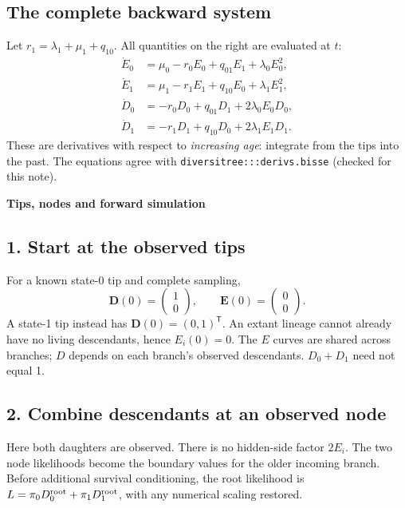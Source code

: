 \documentclass[11pt,a4paper]{article}
\newcommand{\head}[2]{\noindent{\small\sffamily\color{muted}BISSE / #1}\par
 {\LARGE\sffamily\bfseries #2}\par\vspace{3mm}}
\begin{document}
\subsection*{The complete backward system}
Let \(r_1=\lambda_1+\mu_1+q_{10}\). All quantities on the right are evaluated at \(t\):
\[
\begin{aligned}
\dot E_0&=\mu_0-r_0E_0+q_{01}E_1+\lambda_0E_0^2,\\
\dot E_1&=\mu_1-r_1E_1+q_{10}E_0+\lambda_1E_1^2,\\
\dot D_0&=-r_0D_0+q_{01}D_1+2\lambda_0E_0D_0,\\
\dot D_1&=-r_1D_1+q_{10}D_0+2\lambda_1E_1D_1.
\end{aligned}
\]
These are derivatives with respect to \emph{increasing age}: integrate from
the tips into the past. The equations agree with
\texttt{diversitree:::derivs.bisse} (checked for this note).

\newpage
\head{04 / FROM LIKELIHOODS TO MAPS}{Tips, nodes and forward simulation}
\subsection*{1. Start at the observed tips}
For a known state-0 tip and complete sampling,
\[
\mathbf D(0)=\begin{pmatrix}1\\0\end{pmatrix},\qquad
\mathbf E(0)=\begin{pmatrix}0\\0\end{pmatrix}.
\]
A state-1 tip instead has \(\mathbf D(0)=(0,1)^{\mathsf T}\).
An extant lineage cannot already have no living descendants, hence \(E_i(0)=0\).
The \(E\) curves are shared across branches; \(D\) depends on each branch's
observed descendants. \(D_0+D_1\) need not equal 1.

\subsection*{2. Combine descendants at an observed node}
\begin{center}
\end{center}
Here both daughters are observed. There is no hidden-side factor \(2E_i\).
The two node likelihoods become the boundary values for the older incoming
branch. Before additional survival conditioning, the root likelihood is
\(L=\pi_0D_0^{\rm root}+\pi_1D_1^{\rm root}\), with any numerical scaling restored.
\end{document}
